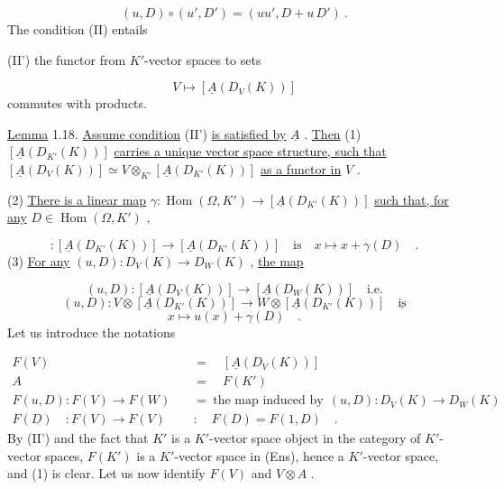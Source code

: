 \begin{equation*}
(u, D) \circ (u', D') = (uu', D + u\,D')\ .
\end{equation*}
The condition (II) entails

(II')  the functor from $K'$-vector spaces to sets

\begin{equation*}
V \longmapsto [\underline{A}(D_V(K))]
\end{equation*}
commutes with products.

\underline{Lemma} 1.18.  \underline{Assume condition} (II') \underline{is satisfied by} $\underline{A}$ . \underline{Then}
(1)  $[\underline{A}(D_{K'}(K))]$  \underline{carries a unique vector space structure, such that}  $[\underline{A}(D_{V}(K))] \simeq V \otimes_{K'} [\underline{A}(D_{K'}(K))]$  \underline{as a functor in}  $V$ .

(2)   \underline{There is a linear map}  $\gamma : \operatorname{Hom}(\Omega,K') \rightarrow [\underline{A}(D_{K'}(K))]$  \underline{such that, for any}  $D \in \operatorname{Hom}(\Omega, K')$  ,

\begin{equation*}
[\underline{A}((k, D))] : [\underline{A}(D_{K'}(K))] \rightarrow [\underline{A}(D_{K'}(K))] \quad \text{is} \quad x \longmapsto x + \gamma(D) \quad .
\end{equation*}
(3)   \underline{For any}  $(u, D) : D_{V}(K) \longrightarrow D_{W}(K)$  , \underline{the map}

\begin{equation*}
(u, D) : [\underline{A}(D_{V}(K))] \rightarrow [\underline{A}(D_{W}(K))] \quad \text{i.e.}
\end{equation*}
\begin{equation*}
(u, D) : V \otimes [\underline{A}(D_{K'}(K))] \rightarrow W \otimes [\underline{A}(D_{K'}(K))] \quad \underline{\text{is}}
\end{equation*}
\begin{equation*}
x \longmapsto u(x) + \gamma(D) \quad .
\end{equation*}
Let us introduce the notations

\begin{equation*}
\begin{aligned}
F(V) \quad &= \quad [\underline{A}(D_{V}(K))] \\
A \quad &= \quad F(K') \\
F(u,D) : F(V) \rightarrow F(W) \quad &= \ \text{the map induced by} \ \ (u,D) : D_{V}(K) \rightarrow D_{W}(K) \\
F(D) \quad : F(V) \rightarrow F(V) \quad &: \quad F(D) = F(1, D) \quad .
\end{aligned}
\end{equation*}
By (II') and the fact that  $K'$  is a  $K'$-vector space object in the category of $K'$-vector spaces,  $F(K')$  is a  $K'$-vector space in (Ens), hence a  $K'$-vector space, and (1) is clear. Let us now identify  $F(V)$  and  $V \otimes A$  .

